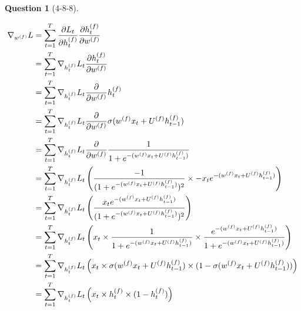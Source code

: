 \documentclass[12pt]{article}
\theoremstyle{definition}
\newtheorem{exercise}{Question}%
\newcommand{\pd}[2]{\frac{\partial#1}{\partial#2}}
\begin{document}
\begin{exercise}[4-8-8]
{\begin{enumerate}
{    \begin{alignat*}{3}
    \nabla_{\expr{w}{}{f}}L &= \sum_{t=1}^T \pd{L_t}{\expr{h}{t}{f}}\pd{\expr{h}{t}{f}}{\expr{w}{}{f}}
    \\
    &= \sum_{t=1}^T \nabla_{h_t^{(f)}}L_t \pd{\expr{h}{t}{f}}{\expr{w}{}{f}}
    \\
    &= \sum_{t=1}^T \nabla_{h_t^{(f)}}L_t\pd{}{\expr{w}{}{f}}\expr{h}{t}{f}
    \\
    &= \sum_{t=1}^T \nabla_{h_t^{(f)}}L_t\pd{}{\expr{w}{}{f}}\sigma(\linearf) 
    \\
    &= \sum_{t=1}^T \nabla_{h_t^{(f)}}L_t\pd{}{\expr{w}{}{f}}\frac{1}{1+e^{-(\linearf)}}
    \\
    &= \sum_{t=1}^T \nabla_{h_t^{(f)}}L_t \left ( \frac{-1}{(1+e^{-(\linearf)})^2} \times -x_t e^{-(\linearf)} \right )
    \\
    &= \sum_{t=1}^T \nabla_{h_t^{(f)}}L_t \left ( \frac{x_t e^{-(\linearf)}}{(1+e^{-(\linearf)})^2} \right )
    \\
    &= \sum_{t=1}^T \nabla_{h_t^{(f)}}L_t \left ( x_t \times \frac{1}{1+e^{-(\linearf)}} \times \frac{e^{-(\linearf)}}{1+e^{-(\linearf)}} \right )
    \\
    &= \sum_{t=1}^T \nabla_{h_t^{(f)}}L_t \left ( x_t \times \sigma(\linearf) \times (1-\sigma(\linearf)) \right )
    \\
    &= \sum_{t=1}^T \nabla_{h_t^{(f)}}L_t \left ( x_t \times \expr{h}{t}{f} \times (1-\expr{h}{t}{f}) \right )
    \end{alignat*}
    
    \newcommand{\linearb}{\expr{w}{}{b}x_{t} + \expr{U}{}{b}\expr{h}{t+1}{b}}
    
}
\end{enumerate}}
\end{exercise}
\end{document}
